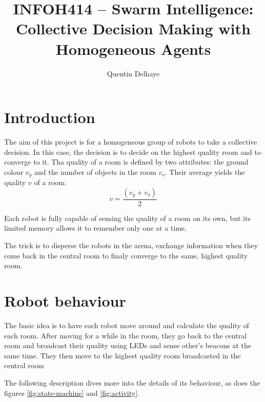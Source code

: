 \documentclass[11pt, a4paper]{article}
\title{INFOH414 -- Swarm Intelligence: Collective Decision Making with Homogeneous Agents}
\author{Quentin Delhaye}
\date{}
\begin{document}
\maketitle


\section{Introduction}
The aim of this project is for a homogeneous group of robots to take a collective decision.
In this case, the decision is to decide on the highest quality room and to converge to it.
Tha quality of a room is defined by two attributes: the ground colour $v_g$ and the number of objects in the room $v_o$.
Their average yields the quality $v$ of a room: \[v = \frac{(v_g + v_o)}{2}\]

Each robot is fully capable of sensing the quality of a room on its own, but its limited memory allows it to remember only one at a time.

The trick is to disperse the robots in the arena, exchange information when they come back in the central room to finaly converge to the same, highest quality room.









\section{Robot behaviour}
The basic idea is to have each robot move around and calculate the quality of each room.
After moving for a while in the room, they go back to the central room and broadcast their quality using LEDs and sense other's beacons at the same time.
They then move to the highest quality room broadcasted in the central room


The following description dives more into the details of its behaviour, as does the figures \ref{fig:state-machine} and \ref{fig:activity}.
\end{document}
